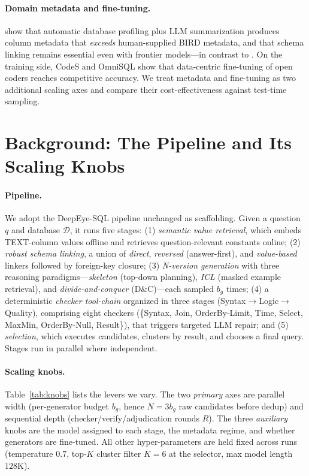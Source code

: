 \documentclass{article}
\begin{document}
\paragraph{Domain metadata and fine-tuning.}
\citet{shkapenyuk2025metadata} show that automatic database profiling plus LLM summarization produces column metadata that \emph{exceeds} human-supplied BIRD metadata, and that schema linking remains essential even with frontier models---in contrast to \citet{maamari2024death}. On the training side, CodeS \citep{li2024codes} and OmniSQL \citep{li2025omnisql} show that data-centric fine-tuning of open coders reaches competitive accuracy. We treat metadata and fine-tuning as two additional scaling axes and compare their cost-effectiveness against test-time sampling.

\section{Background: The Pipeline and Its Scaling Knobs}
\label{sec:background}

\paragraph{Pipeline.}
We adopt the DeepEye-SQL pipeline \citep{li2026deepeye} unchanged as scaffolding. Given a question $q$ and database $\mathcal{D}$, it runs five stages: (1) \emph{semantic value retrieval}, which embeds TEXT-column values offline and retrieves question-relevant constants online; (2) \emph{robust schema linking}, a union of \emph{direct}, \emph{reversed} (answer-first), and \emph{value-based} linkers followed by foreign-key closure; (3) \emph{N-version generation} with three reasoning paradigms---\emph{skeleton} (top-down planning), \emph{ICL} (masked example retrieval), and \emph{divide-and-conquer} (D\&C)---each sampled $b_g$ times; (4) a deterministic \emph{checker tool-chain} organized in three stages (Syntax$\rightarrow$Logic$\rightarrow$Quality), comprising eight checkers (\{Syntax, Join, OrderBy-Limit, Time, Select, MaxMin, OrderBy-Null, Result\}), that triggers targeted LLM repair; and (5) \emph{selection}, which executes candidates, clusters by result, and chooses a final query. Stages run in parallel where independent.

\paragraph{Scaling knobs.}
Table~\ref{tab:knobs} lists the levers we vary. The two \emph{primary} axes are parallel width (per-generator budget $b_g$, hence $N=3b_g$ raw candidates before dedup) and sequential depth (checker/verify/adjudication rounds $R$). The three \emph{auxiliary} knobs are the model assigned to each stage, the metadata regime, and whether generators are fine-tuned. All other hyper-parameters are held fixed across runs (temperature $0.7$, top-$K$ cluster filter $K{=}6$ at the selector, max model length $128$K).
\end{document}
